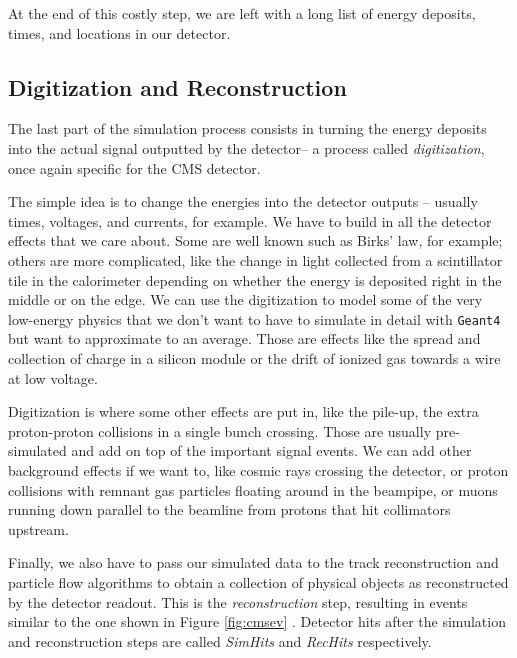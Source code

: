 At the end of this costly step, we are left with a long list of energy deposits, times, and locations in our detector. 

\subsection{Digitization and Reconstruction} 

The last part of the simulation process consists in turning the energy deposits into the actual signal outputted by the detector-- a process called \emph{digitization}, once again specific for the CMS detector.

The simple idea is to change the energies into the detector outputs – usually times, voltages, and currents, for example. We have to build in all the detector effects that we care about. Some are well known such as Birks’ law, for example; others are more complicated, like the change in light collected from a scintillator tile in the calorimeter depending on whether the energy is deposited right in the middle or on the edge. We can use the digitization to model some of the very low-energy physics that we don’t want to have to simulate in detail with \texttt{Geant4} but want to approximate to an average. Those are effects like the spread and collection of charge in a silicon module or the drift of ionized gas towards a wire at low voltage.

Digitization is where some other effects are put in, like the pile-up, the extra proton-proton collisions in a single bunch crossing. Those are usually pre-simulated and add on top of the important signal events. We can add other background effects if we want to, like cosmic rays crossing the detector, or proton collisions with remnant gas particles floating around in the beampipe, or muons running down parallel to the beamline from protons that hit collimators upstream. 

Finally, we also have to pass our simulated data to the track reconstruction and particle flow algorithms to obtain a collection of physical objects as reconstructed by the detector readout. This is the \emph{reconstruction} step, resulting in events similar to the one shown in Figure \ref{fig:cmsev} . Detector hits after the simulation and reconstruction steps are called \emph{SimHits}
and \emph{RecHits} respectively.

